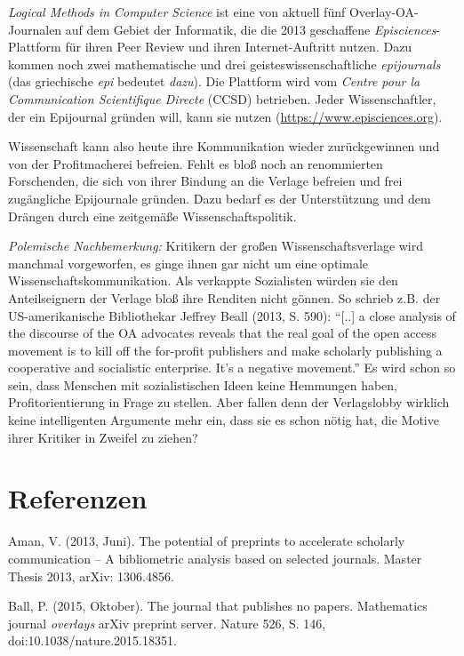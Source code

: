 \documentclass[a4paper,
fontsize=11pt,
oneside,
numbers=noperiodatend,
parskip=half-,
bibliography=totoc,
final
]{scrartcl}
\begin{document}
\emph{Logical Methods in Computer Science} ist eine von aktuell fünf
Overlay-OA-Journalen auf dem Gebiet der Informatik, die die 2013
geschaffene \emph{Episciences}-Plattform für ihren Peer Review und ihren
Internet-Auftritt nutzen. Dazu kommen noch zwei mathematische und drei
geisteswissenschaftliche \emph{epijournals} (das griechische \emph{epi}
bedeutet \emph{dazu}). Die Plattform wird vom \emph{Centre pour la
Communication Scientifique Directe} (CCSD) betrieben. Jeder
Wissenschaftler, der ein Epijournal gründen will, kann sie nutzen
(\url{https://www.episciences.org}).

Wissenschaft kann also heute ihre Kommunikation wieder zurückgewinnen
und von der Profitmacherei befreien. Fehlt es bloß noch an renommierten
Forschenden, die sich von ihrer Bindung an die Verlage befreien und frei
zugängliche Epijournale gründen. Dazu bedarf es der Unterstützung und
dem Drängen durch eine zeitgemäße Wissenschaftspolitik.

\emph{Polemische Nachbemerkung:} Kritikern der großen
Wissenschaftsverlage wird manchmal vorgeworfen, es ginge ihnen gar nicht
um eine optimale Wissenschaftskommunikation. Als verkappte Sozialisten
würden sie den Anteilseignern der Verlage bloß ihre Renditen nicht
gönnen. So schrieb z.B. der US-amerikanische Bibliothekar Jeffrey Beall
(2013, S. 590): \enquote{{[}..{]} a close analysis of the discourse of
the OA advocates reveals that the real goal of the open access movement
is to kill off the for-profit publishers and make scholarly publishing a
cooperative and socialistic enterprise. It's a negative movement.} Es
wird schon so sein, dass Menschen mit sozialistischen Ideen keine
Hemmungen haben, Profitorientierung in Frage zu stellen. Aber fallen
denn der Verlagslobby wirklich keine intelligenten Argumente mehr ein,
dass sie es schon nötig hat, die Motive ihrer Kritiker in Zweifel zu
ziehen?

\hypertarget{referenzen}{%
\section*{Referenzen}\label{referenzen}}

Aman, V. (2013, Juni). The potential of preprints to accelerate
scholarly communication -- A bibliometric analysis based on selected
journals. Master Thesis 2013, arXiv: 1306.4856.

Ball, P. (2015, Oktober). The journal that publishes no papers.
Mathematics journal \emph{overlays} arXiv preprint server. Nature 526,
S. 146, doi:10.1038/nature.2015.18351.
\end{document}
